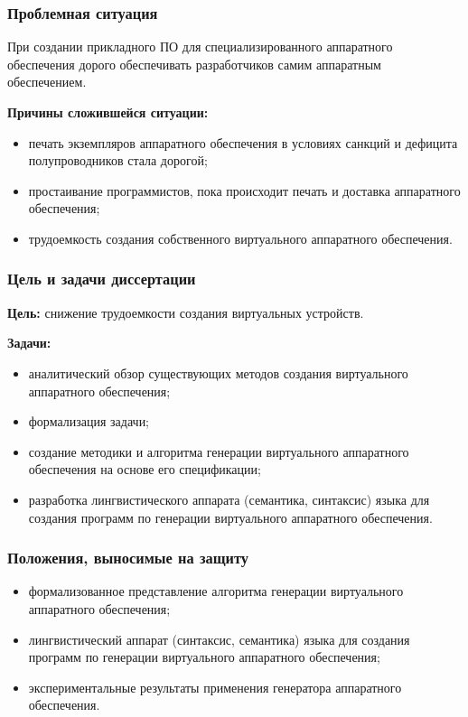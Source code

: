 \begin{frame}%
    \frametitle{Проблемная ситуация}

    При создании прикладного ПО для специализированного аппаратного обеспечения
    дорого обеспечивать разработчиков самим аппаратным обеспечением.

    \textbf{Причины сложившейся ситуации:}
    \begin{itemize}
        \item печать экземпляров аппаратного обеспечения в условиях санкций и дефицита полупроводников стала дорогой;
        \item простаивание программистов, пока происходит печать и доставка аппаратного обеспечения;
        \item трудоемкость создания собственного виртуального аппаратного обеспечения.
    \end{itemize}
\end{frame}


\begin{frame}%
    \frametitle{Цель и задачи диссертации}
    \textbf{Цель:} снижение трудоемкости создания виртуальных устройств.

    \textbf{Задачи:}
    \begin{itemize}
        \item аналитический обзор существующих методов создания виртуального аппаратного обеспечения;
        \item формализация задачи;
        \item создание методики и алгоритма генерации виртуального аппаратного обеспечения на основе его спецификации;
        \item разработка лингвистического аппарата (семантика, синтаксис) языка для создания программ по генерации виртуального
            аппаратного обеспечения.
    \end{itemize}
\end{frame}


\begin{frame}%
    \frametitle{Положения, выносимые на защиту}
    \begin{itemize}
        \item формализованное представление алгоритма генерации виртуального аппаратного обеспечения;
        \item лингвистический аппарат (синтаксис, семантика) языка для создания программ по генерации виртуального
            аппаратного обеспечения;
        \item экспериментальные результаты применения генератора аппаратного обеспечения.
    \end{itemize}
\end{frame}


